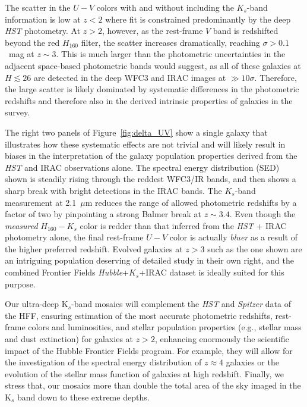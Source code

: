 \documentclass[preprint2]{aastex6}
\begin{document}
The scatter in the $U-V$ colors with and without including the $K_s$-band information is low at $z<2$ where fit is constrained predominantly by the deep \textit{HST} photometry.  At $z>2$, however, as the rest-frame $V$ band is redshifted beyond the red $H_{160}$ filter, the scatter increases dramatically, reaching $\sigma>0.1$~mag at $z\sim3$.  This is much larger than the photometric uncertainties in the adjacent space-based photometric bands would suggest, as all of these galaxies at $H\lesssim26$ are detected in the deep WFC3 and IRAC images at $\gg10$$\sigma$.  Therefore, the large scatter is likely dominated by systematic differences in the photometric redshifts and therefore also in the derived intrinsic properties of galaxies in the survey.  

The right two panels of Figure~\ref{fig:delta_UV} show a single galaxy that illustrates how these systematic effects are not trivial and will likely result in biases in the interpretation of the galaxy population properties derived from the \textit{HST} and IRAC observations alone.  The spectral energy distribution (SED) shown is steadily rising through the reddest WFC3/IR bands, and then shows a sharp break with bright detections in the IRAC bands.  The $K_s$-band measurement at 2.1~$\mu$m reduces the range of allowed photometric redshifts by a factor of two by pinpointing a strong Balmer break at $z\sim3.4$.  Even though the \textit{measured} $H_{160}-K_s$ color is redder than that inferred from the \textit{HST} + IRAC photometry alone, the final rest-frame $U-V$ color is actually \textit{bluer} as a result of the higher preferred redshift.  Evolved galaxies at $z>3$ such as the one shown are an intriguing population deserving of detailed study in their own right, and the combined Frontier Fields \textit{Hubble}+$K_s$+IRAC dataset is ideally suited for this purpose.

Our ultra-deep K$_{s}$-band mosaics will complement the {\it HST} and {\it Spitzer} data of the HFF, ensuring estimation of the most accurate photometric redshifts, rest-frame colors and luminosities, and stellar population properties (e.g., stellar mass and dust extinction) for galaxies at $z>2$, enhancing enormously the scientific impact of the Hubble Frontier Fields program. For example, they will allow for the investigation of the spectral energy distribution of $z\approx4$ galaxies or the evolution of the stellar mass function of galaxies at high redshift. Finally, we stress that, our mosaics more than double the total area of the sky imaged in the K$_{s}$ band down to these extreme depths. 
\end{document}
